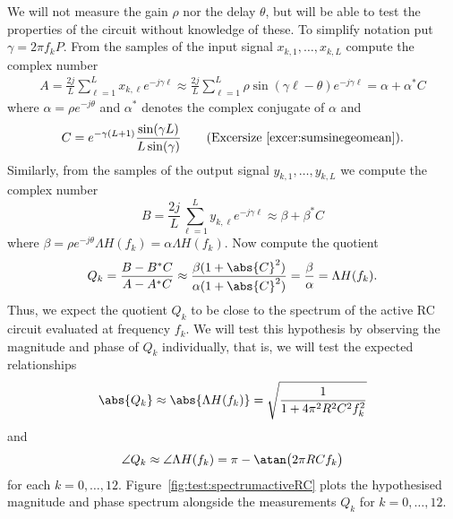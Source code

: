 \begin{test}
We will not measure the gain $\rho$ nor the delay $\theta$, but will be able to test the properties of the circuit without knowledge of these.  To simplify notation put $\gamma = 2\pi f_k P$.  From the samples of the input signal $x_{k,1},\dots,x_{k,L}$ compute the complex number
\begin{align*}
A = \frac{2j}{L}\sum_{\ell=1}^{L} x_{k,\ell} e^{-j \gamma \ell} 
\approx \frac{2j}{L}\sum_{\ell=1}^{L} \rho \sin( \gamma \ell - \theta)  e^{-j \gamma \ell} 
= \alpha + \alpha^* C
\end{align*}
where $\alpha = \rho e^{- j \theta}$ and $\alpha^*$ denotes the complex conjugate of $\alpha$ and
\[
C = e^{-\gamma (L+1)} \frac{  \sin( \gamma L)  }{L \sin(\gamma)  } \qquad \text{(Excersize~\ref{excer:sumsinegeomean})} .
\]
Similarly, from the samples of the output signal $y_{k,1},\dots,y_{k,L}$ we compute the complex number
\[
B = \frac{2j}{L}\sum_{\ell=1}^{L} y_{k,\ell} e^{-j \gamma\ell} \approx \beta + \beta^*C
\]
where $\beta = \rho  e^{-j\theta} \Lambda H(f_k) = \alpha \Lambda H(f_k)$.  Now compute the quotient
\[
Q_k = \frac{B - B^* C}{A - A^* C} \approx \frac{\beta (1 + \abs{C}^2)}{\alpha (1 + \abs{C}^2)} = \frac{\beta}{\alpha} = \Lambda H(f_k).
\]
Thus, we expect the quotient $Q_k$ to be close to the spectrum of the active RC circuit evaluated at frequency $f_k$.  We will test this hypothesis by observing the magnitude and phase of $Q_k$ individually, that is, we will test the expected relationships
\[
\abs{Q_k} \approx \abs{\Lambda H(f_k)} = \sqrt{\frac{1}{1 + 4\pi^2 R^2 C^2 f_k^2}}
\]
and
\[
\angle Q_k \approx \angle \Lambda H(f_k) = \pi - \atan\big( 2\pi R C f_k \big)
\]
for each $k = 0,\dots,12$.  Figure~\ref{fig:test:spectrumactiveRC} plots the hypothesised magnitude and phase spectrum alongside the measurements $Q_k$ for $k = 0, \dots, 12$.

\end{test}

